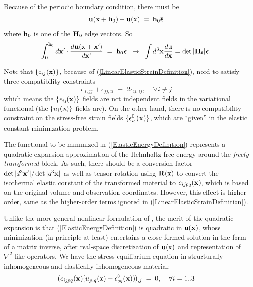 \documentclass[12pt]{article}
\def\bmath#1{\mbox{\boldmath$#1$}}
\begin{document}
Because of the periodic boundary condition, there must be 
\begin{equation}
 {\bf u}({\bf x}+{\bf
h}_0)-{\bf u}({\bf x}) \;=\; {\bf h}_0\bar{\bmath{\epsilon}}
\end{equation}
where ${\bf
h}_0$ is one of the ${\bf H}_0$ edge vectors.  So
\begin{equation}
 \int_0^{{\bf h}_0} d{\bf x}^\prime\cdot 
\frac{d{\bf u}({\bf x}+{\bf x}^\prime)}{d{\bf x}^\prime} 
 \;=\; 
 {\bf h}_0\bar{\bmath{\epsilon}}  \;\;\rightarrow\;\;
 \int d^3{\bf x} \frac{d{\bf u}}{d{\bf x}} =  \det|{\bf H}_0| 
 \bar{\bmath{\epsilon}}.
\end{equation}

Note that $\{\epsilon_{ij}({\bf x})\}$, because of
(\ref{LinearElasticStrainDefinition}), need to satisfy three compatibility
constraints
\begin{equation}
 \epsilon_{ii,jj} + \epsilon_{jj,ii} \;=\; 2 \epsilon_{ij,ij}, 
 \;\;\;\; \forall i\neq j
\end{equation}
which means the $\{\epsilon_{ij}({\bf x})\}$ fields are
not independent fields in the variational functional (the $\{u_i({\bf
x})\}$ fields are). On the other hand, there is no compatibility
constraint \cite{Jagla07} on the stress-free strain fields
$\{\epsilon^0_{ij}({\bf x})\}$, which are ``given'' in the elastic
constant minimization problem.

The functional to be minimized in (\ref{ElasticEnergyDefinition})
represents a quadratic expansion approximation of the Helmholtz free
energy \cite{LiPhDThesis00} around the {\em freely transformed} block.
As such, there should be a conversion factor $\det|d^3{\bf
x}^\prime|/\det|d^3{\bf x}|$ as well as tensor rotation using ${\bf
R}({\bf x})$ to convert the isothermal elastic constant of the
transformed material to $c_{ijpq}({\bf x})$, which is based on the
original volume and observation coordinates.  However, this effect is
higher order, same as the higher-order terms ignored in
(\ref{LinearElasticStrainDefinition}).

Unlike the more general nonlinear formulation of \cite{Jagla07}, the
merit of the quadratic expansion is that
(\ref{ElasticEnergyDefinition}) is quadratic in ${\bf u}({\bf x})$,
whose minimization (in principle at least) entertains a close-formed
solution in the form of a matrix inverse, after real-space
discretization of ${\bf u}({\bf x})$ and representation of
$\nabla^2$-like operators. We have the stress equilibrium equation in
structurally inhomogeneous and elastically inhomogeneous material:
\begin{equation}
 ( c_{ijpq}({\bf x}) 
  ( u_{p,q}({\bf x}) - \epsilon^0_{pq}({\bf x}) ))_{,j} \;=\; 0, 
  \;\;\;\;
  \forall i=1..3
 \label{StressEquilibrium}
\end{equation}
\end{document}
